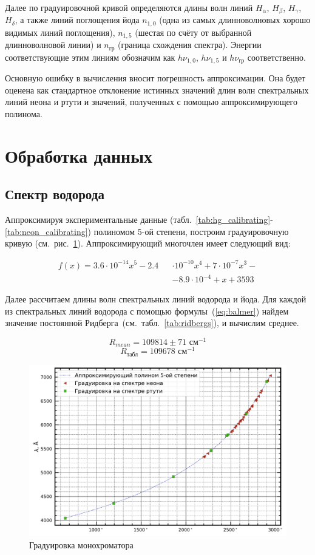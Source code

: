 \documentclass[reprint, nofootinbib, 10pt]{revtex4-2}
\begin{document}
Далее по градуировочной кривой определяются длины волн линий $H_\alpha$, $H_\beta$, $H_\gamma$,
$H_\delta$, а также линий поглощения йода $n_{1, 0}$ (одна из самых длинноволновых хорошо видимых линий поглощения),
$n_{1, 5}$ (шестая по счёту от выбранной длинноволновой линии) и $n_{\text{гр}}$ (граница схождения спектра).
Энергии соответствующие этим линиям обозначим как $h \nu_{1, 0}$, $h \nu_{1, 5}$ и $h \nu_{\text{гр}}$ соответственно.

Основную ошибку в вычисления вносит погрешность аппроксимации. Она будет оценена как стандартное отклонение
истинных значений длин волн спектральных линий неона и ртути и значений, полученных с помощью аппроксимирующего
полинома.

\section*{Обработка данных}


\subsection*{Спектр водорода}

Аппроксимируя экспериментальные данные (табл.~\ref{tab:hg_calibrating}-\ref{tab:neon_calibrating})
полиномом 5-ой степени, построим градуировочную кривую (см.~рис.~\ref{graph:calibrating}).
Аппроксимирующий многочлен имеет следующий вид:

\begin{eqnarray*}
	f(x) = 3.6 \cdot 10^{-14} x^5 - 2.4 &&\cdot 10^{-10} x^4 + 7 \cdot 10^{-7} x^3 -\\
	&&- 8.9 \cdot 10^{-4} + x + 3593
\end{eqnarray*}

Далее рассчитаем длины волн спектральных линий водорода и йода.
Для каждой из спектральных линий водорода с помощью формулы~(\ref{eq:balmer})
найдем значение постоянной Ридберга~(см.~табл.~\ref{tab:ridbergs}),
и вычислим среднее.

\[ R_{mean} = 109814 \pm 71 \text{ см}^{-1} \]
\[ R_{\text{табл}} = 109678 \text{ см}^{-1} \]

\begin{figure}[ht]
	\includegraphics[width=\linewidth]{calibrating.pdf}
	\caption{Градуировка монохроматора}
	\label{graph:calibrating}
\end{figure}
\end{document}
